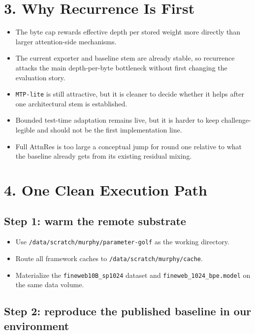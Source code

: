 \documentclass[11pt]{article}
\begin{document}
\section*{3. Why Recurrence Is First}

\begin{itemize}
    \item The byte cap rewards effective depth per stored weight more directly than larger attention-side mechanisms.
    \item The current exporter and baseline stem are already stable, so recurrence attacks the main depth-per-byte bottleneck without first changing the evaluation story.
    \item \texttt{MTP-lite} is still attractive, but it is cleaner to decide whether it helps after one architectural stem is established.
    \item Bounded test-time adaptation remains live, but it is harder to keep challenge-legible and should not be the first implementation line.
    \item Full AttnRes is too large a conceptual jump for round one relative to what the baseline already gets from its existing residual mixing.
\end{itemize}

\section*{4. One Clean Execution Path}

\subsection*{Step 1: warm the remote substrate}

\begin{itemize}
    \item Use \texttt{/data/scratch/murphy/parameter-golf} as the working directory.
    \item Route all framework caches to \texttt{/data/scratch/murphy/cache}.
    \item Materialize the \texttt{fineweb10B\_sp1024} dataset and \texttt{fineweb\_1024\_bpe.model} on the same data volume.
\end{itemize}

\subsection*{Step 2: reproduce the published baseline in our environment}
\end{document}
